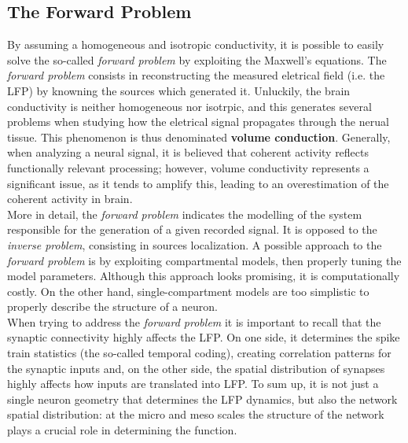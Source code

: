 \subsection{The Forward Problem}
By assuming a homogeneous and isotropic conductivity, it is possible to easily
solve the so-called \textit{forward problem} by exploiting the Maxwell's equations.
The \textit{forward problem} consists in reconstructing the measured eletrical field 
(i.e. the LFP) by knowning the sources which generated it. Unluckily, the
brain conductivity is neither homogeneous nor isotrpic, and this generates several
problems when studying how the eletrical signal propagates through the nerual tissue.
This phenomenon is thus denominated \textbf{volume conduction}. Generally, when analyzing a
neural signal, it is believed that coherent activity reflects functionally relevant
processing; however, volume conductivity represents a significant issue, as it
tends to amplify this, leading to an overestimation of the coherent activity
in brain.\\
More in detail, the \textit{forward problem} indicates the modelling of the system
responsible for the generation of a given recorded signal. It is opposed to the
\textit{inverse problem}, consisting in sources localization. A possible approach
to the \textit{forward problem} is by exploiting compartmental models, then
properly tuning the model parameters. Although this approach looks promising,
it is computationally costly. On the other hand, single-compartment models
are too simplistic to properly describe the structure of a neuron.\\
When trying to address the \textit{forward problem} it is important to recall
that the synaptic connectivity highly affects the LFP. On one side, it
determines the spike train statistics (the so-called temporal coding), creating
correlation patterns for the synaptic inputs and, on the other side, the spatial
distribution of synapses highly affects how inputs are translated into LFP.
To sum up, it is not just a single neuron geometry that determines the LFP
dynamics, but also the network spatial distribution: at the micro and meso
scales the structure of the network plays a crucial role in determining
the function.

